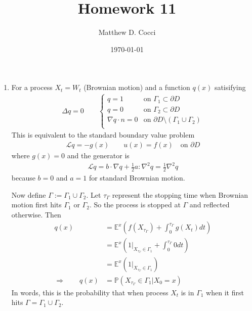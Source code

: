 \documentclass[12pt]{article}
\author{Matthew D. Cocci}
\title{Homework 11}
\date{\today}
\theoremstyle{plain}
\theoremstyle{definition}
\theoremstyle{remark}
\begin{document}
\maketitle



\begin{enumerate}
  \item %
    For a process $X_t=W_t$ (Brownian motion) and a function $q(x)$
    satisifying
    \begin{align*}
      \Delta q = 0
      \qquad
      \begin{cases}
        q = 1 & \text{on } \Gamma_1 \subset \partial D \\
        q = 0 & \text{on } \Gamma_2 \subset \partial D \\
        \nabla q \cdot n = 0 &
          \text{on } \partial D \setminus (\Gamma_1 \cup \Gamma_2) \\
      \end{cases}
    \end{align*}
    This is equivalent to the standard boundary value problem
    \begin{align*}
      \mathscr{L}q = -g(x) \qquad u(x) = f(x) \quad \text{on $\partial D$}
    \end{align*}
    where $g(x)=0$ and the generator is
    \begin{align*}
      \mathscr{L}q = b\cdot \nabla q +
      \frac{1}{2} a : \nabla^2 q = \frac{1}{2}\nabla^2 q
    \end{align*}
    because $b=0$ and $a=1$ for standard Brownian motion.

    Now define $\Gamma := \Gamma_1 \cup \Gamma_2$. Let $\tau_\Gamma$
    represent the stopping time when Brownian motion first hits
    $\Gamma_1$ or $\Gamma_2$. So the process is stopped at $\Gamma$ and
    reflected otherwise. Then
    \begin{align*}
      q(x)
      &= \mathbb{E}^x\left(
        f(X_{\tau_\Gamma}) + \int^{\tau_\Gamma}_0 g(X_t) dt
        \right) \\
      &= \mathbb{E}^x\left(
        1|_{X_{\tau_\Gamma}\in \Gamma_1} + \int^{\tau_\Gamma}_0 0 dt
        \right) \\
      &= \mathbb{E}^x\left( 1|_{X_{\tau_\Gamma}\in \Gamma_1}\right)\\
      \Rightarrow\qquad
      q(x)
      &= \mathbb{P}\left( {X_{\tau_\Gamma}\in \Gamma_1} | X_0 =x\right)
    \end{align*}
    In words, this is the probability that when process $X_t$ is in
    $\Gamma_1$ when it first hits $\Gamma = \Gamma_1 \cup \Gamma_2$.


\end{enumerate}
\end{document}
